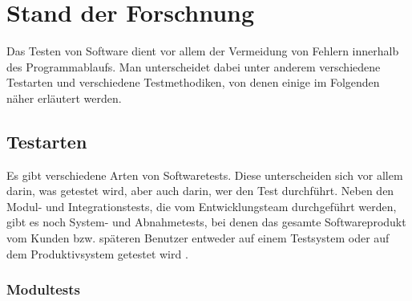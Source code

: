 \section{Stand der Forschnung}

Das Testen von Software dient vor allem der Vermeidung von Fehlern innerhalb des Programmablaufs. Man unterscheidet dabei unter anderem verschiedene Testarten und verschiedene Testmethodiken, von denen einige im Folgenden näher erläutert werden.

\subsection{Testarten}

Es gibt verschiedene Arten von Softwaretests. Diese unterscheiden sich vor allem darin, was getestet wird, aber auch darin, wer den Test durchführt. Neben den Modul- und Integrationstests, die vom Entwicklungsteam durchgeführt werden, gibt es noch System- und Abnahmetests, bei denen das gesamte Softwareprodukt vom Kunden bzw. späteren Benutzer entweder auf einem Testsystem oder auf dem Produktivsystem getestet wird \citep[Vgl.][]{Wiki13-04}.

\subsubsection{Modultests}

